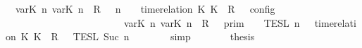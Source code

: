 \begin{isabellebody}
\ {\isacartoucheopen}{\isasymlbrakk}\ {\isacharparenleft}{\isacharparenleft}{\isasymlfloor}{\isasymtau}\isactrlsub v\isactrlsub a\isactrlsub r{\isacharparenleft}K\ n{\isacharparenright}{\isacharcomma}\ {\isasymtau}\isactrlsub v\isactrlsub a\isactrlsub r{\isacharparenleft}K\ n{\isacharparenright}{\isasymrfloor}\ {\isasymin}\ R{\isacharparenright}\ {\isacharhash}\ {\isasymGamma}{\isacharparenright}{\isacharcomma}\ n\ {\isasymturnstile}\ {\isasymPsi}\ {\isasymtriangleright}\ {\isacharparenleft}{\isacharparenleft}time{\isacharminus}relation\ {\isasymlfloor}K\ K\ {\isasymin}\ R{\isacharparenright}\ {\isacharhash}\ {\isasymPhi}{\isacharparenright}\ {\isasymrbrakk}\isactrlsub c\isactrlsub o\isactrlsub n\isactrlsub f\isactrlsub i\isactrlsub g\isanewline
\ \ \ \ \ \ \ \ \ \ \ \ \ \ \ \ \ \ \ \ \ \ {\isacharequal}\ {\isasymlbrakk}{\isasymlbrakk}\ {\isacharparenleft}{\isasymlfloor}{\isasymtau}\isactrlsub v\isactrlsub a\isactrlsub r{\isacharparenleft}K\ n{\isacharparenright}{\isacharcomma}\ {\isasymtau}\isactrlsub v\isactrlsub a\isactrlsub r{\isacharparenleft}K\ n{\isacharparenright}{\isasymrfloor}\ {\isasymin}\ R{\isacharparenright}\ {\isacharhash}\ {\isasymGamma}\ {\isasymrbrakk}{\isasymrbrakk}\isactrlsub p\isactrlsub r\isactrlsub i\isactrlsub m\ {\isasyminter}\ {\isasymlbrakk}{\isasymlbrakk}\ {\isasymPsi}\ {\isasymrbrakk}{\isasymrbrakk}\isactrlsub T\isactrlsub E\isactrlsub S\isactrlsub L\isactrlbsup {\isasymge}\ n\isactrlesup \ {\isasyminter}\ {\isasymlbrakk}{\isasymlbrakk}\ {\isacharparenleft}time{\isacharminus}relation\ {\isasymlfloor}K\ K\ {\isasymin}\ R{\isacharparenright}\ {\isacharhash}\ {\isasymPhi}\ {\isasymrbrakk}{\isasymrbrakk}\isactrlsub T\isactrlsub E\isactrlsub S\isactrlsub L\isactrlbsup {\isasymge}\ Suc\ n\isactrlesup {\isacartoucheclose}\isanewline
\ \ \ \ \ \ \isamarkupfalse%
\ simp\isanewline
\ \ \ \ \isamarkupfalse%
\ \isamarkupfalse%
\ {\isacharquery}thesis\isanewline
\ \ \ \ \isamarkupfalse%
\ {\isacharminus}\isanewline
\ \ \ \ \ \ \isamarkupfalse%

\end{isabellebody}
